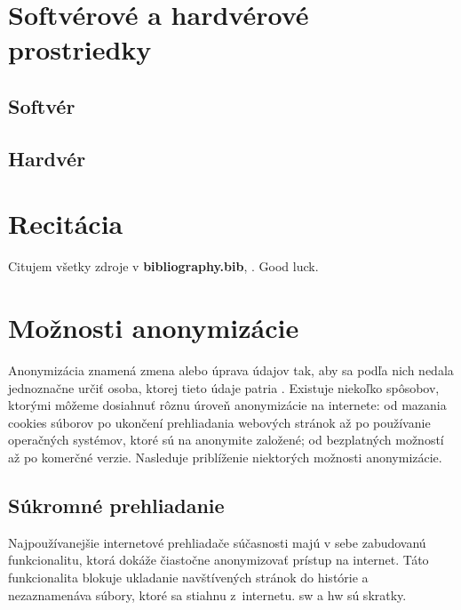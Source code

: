 \section{Softvérové a hardvérové prostriedky}%
\subsection{Softvér}%

\subsection{Hardvér}%
\label{ssec:hw}

\section{Recitácia}

Citujem všetky zdroje v \textbf{bibliography.bib}, \cite{t00, t01, t02, t03, kniha, kniha2, kniha3, small, big, cs, koll, kap, tug, knuth, zbornik, prispevok}. \newline Good luck.
\section{Možnosti anonymizácie}
\noindent Anonymizácia znamená zmena alebo úprava údajov tak, aby sa podľa nich nedala jednoznačne určiť osoba, ktorej tieto údaje patria \cite{t01}. Existuje niekoľko spôsobov, ktorými môžeme dosiahnuť rôznu úroveň anonymizácie na internete: od mazania cookies súborov po ukončení prehliadania webových stránok až po používanie operačných systémov, ktoré sú na anonymite založené; od bezplatných možností až po komerčné verzie.  
\newline Nasleduje priblíženie niektorých možnosti anonymizácie.

\subsection{Súkromné prehliadanie}
\noindent Najpoužívanejšie internetové prehliadače súčasnosti majú v sebe zabudovanú funkcionalitu, ktorá dokáže čiastočne anonymizovať prístup na internet. Táto funkcionalita blokuje ukladanie navštívených stránok do histórie a nezaznamenáva súbory, ktoré sa stiahnu z~internetu. \acrshort{sw} a \acrlong{hw} sú skratky.

